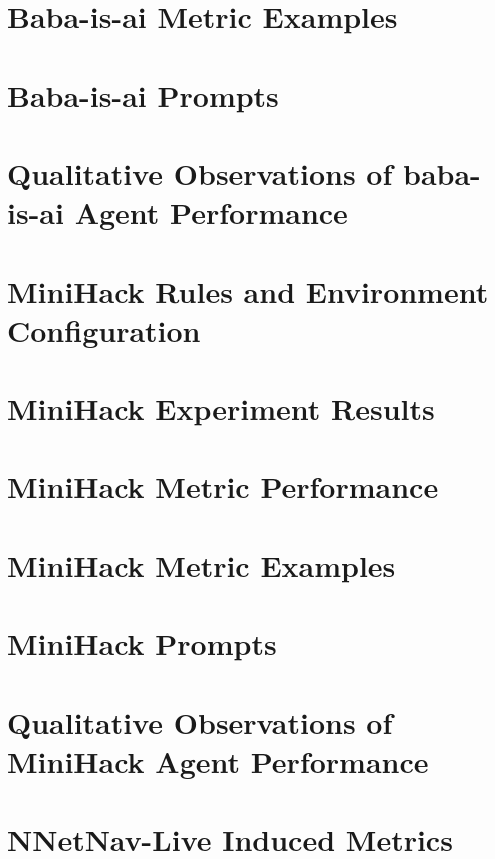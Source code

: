 \section{Baba-is-ai Metric Examples}
\label{appendix:babaisai_metrics}

\newpage

\section{Baba-is-ai Prompts}
\label{appendix:babaisai_prompts}

\newpage

\section{Qualitative Observations of baba-is-ai Agent Performance}
\label{appendix:baba_is_ai_obs}

\newpage

\section{MiniHack Rules and Environment Configuration}
\label{appendix:minihack_rules}


\section{MiniHack Experiment Results}
\label{appendix:heldout_mini}


\section{MiniHack Metric Performance}
\label{appendix:minihack}

\newpage

\section{MiniHack Metric Examples}
\label{appendix:minihack_metrics}

\newpage

\section{MiniHack Prompts}
\label{appendix:minihack_prompts}

\newpage

\section{Qualitative Observations of MiniHack Agent Performance}
\label{appendix:minihack_obs}


\section{NNetNav-Live Induced Metrics}
\label{appendix:nnetnav_live}
